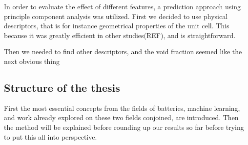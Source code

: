 In order to evaluate the effect of different features, a prediction approach using principle component analysis was utilized. First we decided to use physical descriptors, that is for instance geometrical properties of the unit cell. This because it was greatly efficient in other studies(REF), and is straightforward. 

Then we needed to find other descriptors, and the void fraction seemed like the next obvious thing

\subsection{Structure of the thesis}

First the most essential concepts from the fields of batteries, machine learning, and work already explored on these two fields conjoined, are introduced. Then the method will be explained before rounding up our results so far before trying to put this all into perspective.